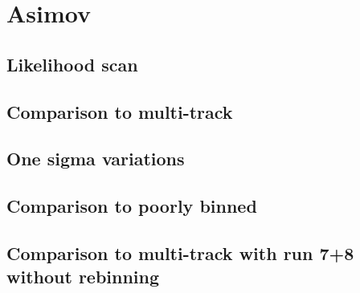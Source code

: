 \section{Asimov}
\subsection{Likelihood scan}
\subsection{Comparison to multi-track}
\subsection{One sigma variations}
\subsection{Comparison to poorly binned}

\subsection{Comparison to multi-track with run 7+8 without rebinning}
